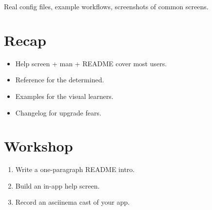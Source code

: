 Real config files, example workflows, screenshots of
common screens.

\section{Recap}

\begin{recap}
\begin{itemize}[leftmargin=*]
  \item Help screen + man + README cover most users.
  \item Reference for the determined.
  \item Examples for the visual learners.
  \item Changelog for upgrade fears.
\end{itemize}
\end{recap}

\section*{Workshop}

\begin{enumerate}[leftmargin=*]
  \item Write a one-paragraph README intro.
  \item Build an in-app help screen.
  \item Record an asciinema cast of your app.
\end{enumerate}
